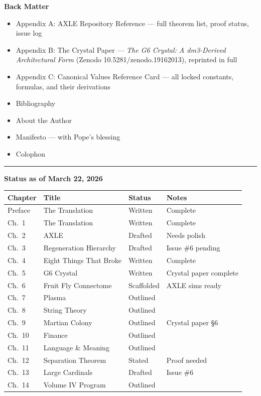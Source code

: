 \documentclass[12pt, oneside]{book}
\begin{document}
\noindent\textbf{Back Matter}
\begin{itemize}[leftmargin=2em]
\item Appendix A: AXLE Repository Reference ---
      full theorem list, proof status, issue log
\item Appendix B: The Crystal Paper ---
      \textit{The G6 Crystal: A dm3-Derived Architectural Form}
      (Zenodo 10.5281/zenodo.19162013), reprinted in full
\item Appendix C: Canonical Values Reference Card ---
      all locked constants, formulas, and their derivations
\item Bibliography
\item About the Author
\item Manifesto --- with Pope's blessing
\item Colophon
\end{itemize}

\vspace{0.5cm}
\hrule
\vspace{0.5cm}


\noindent\textbf{Status as of March 22, 2026}

\medskip
\begin{tabular}{llll}
\toprule
\textbf{Chapter} & \textbf{Title} & \textbf{Status} & \textbf{Notes} \\
\midrule
Preface & The Translation & Written & Complete \\
Ch.\ 1  & The Translation & Written & Complete \\
Ch.\ 2  & AXLE & Drafted & Needs polish \\
Ch.\ 3  & Regeneration Hierarchy & Drafted & Issue \#6 pending \\
Ch.\ 4  & Eight Things That Broke & Written & Complete \\
Ch.\ 5  & G6 Crystal & Written & Crystal paper complete \\
Ch.\ 6  & Fruit Fly Connectome & Scaffolded & AXLE sims ready \\
Ch.\ 7  & Plasma & Outlined & \\
Ch.\ 8  & String Theory & Outlined & \\
Ch.\ 9  & Martian Colony & Outlined & Crystal paper §6 \\
Ch.\ 10 & Finance & Outlined & \\
Ch.\ 11 & Language \& Meaning & Outlined & \\
Ch.\ 12 & Separation Theorem & Stated & Proof needed \\
Ch.\ 13 & Large Cardinals & Drafted & Issue \#6 \\
Ch.\ 14 & Volume IV Program & Outlined & \\
\bottomrule
\end{tabular}
\end{document}
